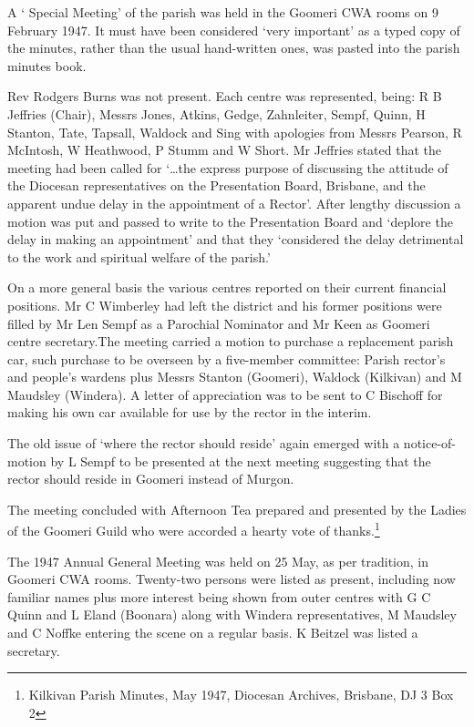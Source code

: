 A ` Special Meeting' of the parish was held in the Goomeri CWA rooms on 9 February 1947. It must have been considered `very important' as a typed copy of the minutes, rather than the usual hand-written ones, was pasted into the parish minutes book.



Rev Rodgers Burns was not present. Each centre was represented, being: R B Jeffries (Chair), Messrs Jones, Atkins, Gedge, Zahnleiter, Sempf, Quinn, H Stanton, Tate, Tapsall, Waldock and Sing with apologies from Messrs Pearson, R McIntosh, W Heathwood, P Stumm and W Short. Mr Jeffries stated that the meeting had been called for `\ldots the express purpose of discussing the attitude of the Diocesan representatives on the Presentation Board, Brisbane, and the apparent undue delay in the appointment of a Rector'. After lengthy discussion a motion was put and passed to write to the Presentation Board and `deplore the delay in making an appointment' and that they `considered the delay detrimental to the work and spiritual welfare of the parish.'



On a more general basis the various centres reported on their current financial positions. Mr C Wimberley had left the district and his former positions were filled by Mr Len Sempf as a Parochial Nominator and Mr Keen as Goomeri centre secretary.The meeting carried a motion to purchase a replacement parish car, such purchase to be overseen by a five-member committee: Parish rector's and people's wardens plus Messrs Stanton (Goomeri), Waldock (Kilkivan) and M Maudsley (Windera). A letter of appreciation was to be sent to C Bischoff for making his own car available for use by the rector in the interim.



The old issue of `where the rector should reside' again emerged with a notice-of-motion by L Sempf to be presented at the next meeting suggesting that the rector should reside in Goomeri instead of Murgon.



The meeting concluded with Afternoon Tea prepared and presented by the Ladies of the Goomeri Guild who were accorded a hearty vote of thanks.\footnote{Kilkivan Parish Minutes, May 1947, Diocesan Archives, Brisbane, DJ 3 Box 2}


The 1947 Annual General Meeting was held on 25 May, as per tradition, in Goomeri CWA rooms. Twenty-two persons were listed as present, including now familiar names plus more interest being shown from outer centres with G C Quinn and L Eland (Boonara) along with Windera representatives, M Maudsley and C Noffke entering the scene on a regular basis. K Beitzel was listed a secretary.



